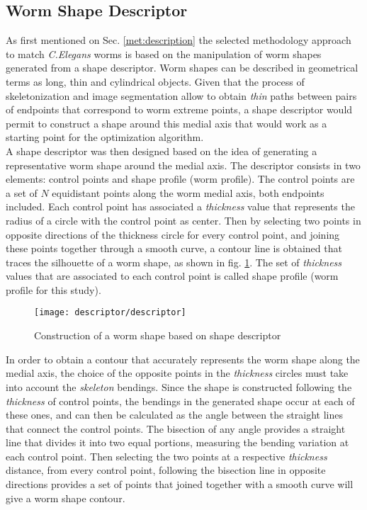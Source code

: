 \subsection{Worm Shape Descriptor}
\label{sec:metshapedescriptor}

As first mentioned on Sec. \ref{met:description} the selected methodology approach 
to match \emph{C.Elegans} worms is based on the manipulation of 
worm shapes generated from a shape descriptor.
Worm shapes can be described in geometrical terms as long, thin and cylindrical 
objects. Given that the process of skeletonization and image segmentation allow
to obtain \emph{thin} paths between pairs of endpoints that correspond to worm 
extreme points, a shape descriptor would permit to construct a shape around this
medial axis that would work as a starting point for the optimization algorithm. \\

A shape descriptor was then designed based on the idea of generating a representative
worm shape around the medial axis. The descriptor consists in two 
elements: control points and shape profile (worm profile). The control points are
a set of $N$ equidistant points along the worm medial axis, both endpoints included.
Each control point has associated a \emph{thickness} value that represents the
radius of a circle with the control point as center. Then by selecting two points
in opposite directions of the thickness circle for every control point, and joining
these points together through a smooth curve, a contour line is obtained that traces
the silhouette of a worm shape, as shown in fig. \ref{fig:descriptor}. 
The set of \emph{thickness} values that are associated to each control point
is called shape profile (worm profile for this study).

\begin{figure}[h t b p ! H]
 \centering
   \texttt{[image: descriptor/descriptor]}
 \caption{Construction of a worm shape based on shape descriptor}
 \label{fig:descriptor}
\end{figure}

In order to obtain a contour that accurately represents the worm shape along the 
medial axis, the choice of the opposite points in the \emph{thickness} circles 
must take into account the \emph{skeleton} bendings.
Since the shape is constructed following the \emph{thickness} of control points,
the bendings in the generated shape occur at each of these ones, and can then be 
calculated as the angle between the straight lines that connect the control points.
The bisection of any angle provides a straight line that divides it
into two equal portions, measuring the bending variation at each control point.
Then selecting the two points at a respective \emph{thickness} distance, from every control
point, following the bisection line in opposite directions provides a set of points
that joined together with a smooth curve will give a worm shape contour.\\


